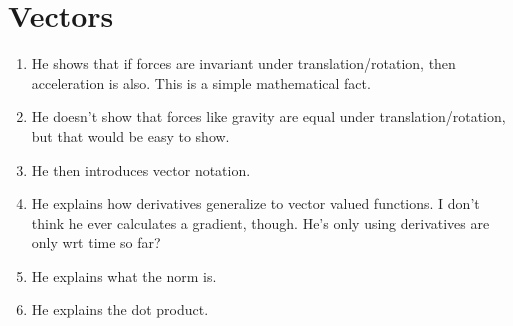 \section{Vectors}

\begin{enumerate}

  \item He shows that if forces are invariant under
  translation/rotation, then acceleration is also. This is a simple
  mathematical fact.

  \item He doesn't show that forces like gravity are equal under
  translation/rotation, but that would be easy to show.

  \item He then introduces vector notation.

  \item He explains how derivatives generalize to vector valued
  functions. I don't think he ever calculates a gradient, though. He's
  only using derivatives are only wrt time so far?

  \item He explains what the norm is.

  \item He explains the dot product.

\end{enumerate}
